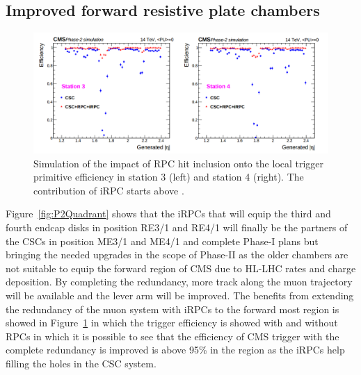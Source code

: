 	\subsection{Improved forward resistive plate chambers}
	\label{chapt3:ssec:iRPCs}

	\begin{figure}[H]
		\centering
		\includegraphics[width=\linewidth]{fig/chapt3/Trigger-efficiency-endcap.png}
		\caption{\label{fig:Endcap-trigger-eff} Simulation of the impact of RPC hit inclusion onto the local trigger primitive efficiency in station 3 (left) and station 4 (right). The contribution of iRPC starts above .}
	\end{figure}
	
	Figure~\ref{fig:P2Quadrant} shows that the iRPCs that will equip the third and fourth endcap disks in position RE3/1 and RE4/1 will finally be the partners of the CSCs in position ME3/1 and ME4/1 and complete Phase-I plans but bringing the needed upgrades in the scope of Phase-II as the older chambers are not suitable to equip the forward region of CMS due to HL-LHC rates and charge deposition. By completing the redundancy, more track along the muon trajectory will be available and the lever arm will be improved. The benefits from extending the redundancy of the muon system with iRPCs to the forward most region is showed in Figure~\ref{fig:Endcap-trigger-eff} in which the trigger efficiency is showed with and without RPCs in which it is possible to see that the efficiency of CMS trigger with the complete redundancy is improved is above 95\% in the region  as the iRPCs help filling the holes in the CSC system.\\
	
